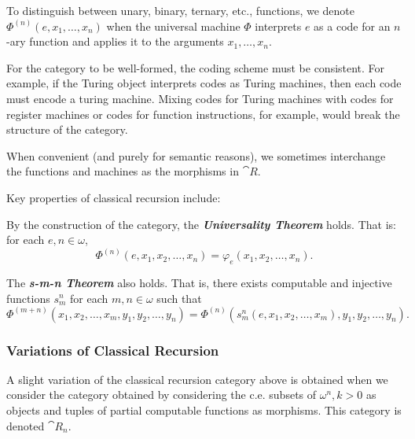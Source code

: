   To distinguish between unary, binary, ternary, etc., functions,
  we denote $\Phi^{(n)}(e, x_1, \ldots, x_n)$ when the universal machine
  $\Phi$ interprets $e$ as a code for an $n$-ary function
  and applies it to the arguments $x_1, \ldots, x_n$.

  \begin{remark}
    For the category to be well-formed, the coding scheme must be consistent.
    For example, if the Turing object interprets codes as Turing machines,
    then each code must encode a turing machine.
    Mixing codes for Turing machines with codes for register machines
    or codes for function instructions,
    for example, would break the structure of the category.
  \end{remark}
  
  \begin{remark}
    When convenient (and purely for semantic reasons), we sometimes interchange
    the functions and machines as the morphisms in $\cat{R}$.
  \end{remark}

  Key properties of classical recursion include:
  \begin{enumalph}
    \item By the construction of the category, the \textbf{\emph{Universality Theorem}}
      holds. That is: for each $e, n \in \omega$,
      \[
        \Phi^{(n)}(e, x_1, x_2, \ldots, x_n) = \varphi_e(x_1, x_2, \ldots, x_n).
      \]
    \item The \textbf{\emph{s-m-n Theorem}} also holds.
      That is, there exists computable and injective functions
      $s_m^n$ for each $m, n \in \omega$ such that
      \[
        \Phi^{(m+n)}(x_1, x_2, \ldots, x_m, y_1, y_2, \ldots, y_n)
        = \Phi^{(n)}(s_m^n(e, x_1, x_2, \ldots, x_m), y_1, y_2, \ldots, y_n).
      \]
  \end{enumalph}

\subsubsection{Variations of Classical Recursion}

A slight variation of the classical recursion category above is obtained
when we consider the category obtained by considering
the c.e. subsets of $\omega^n, k > 0$ as objects
and tuples of partial computable functions as morphisms.
This category is denoted $\cat{R}_n$.


